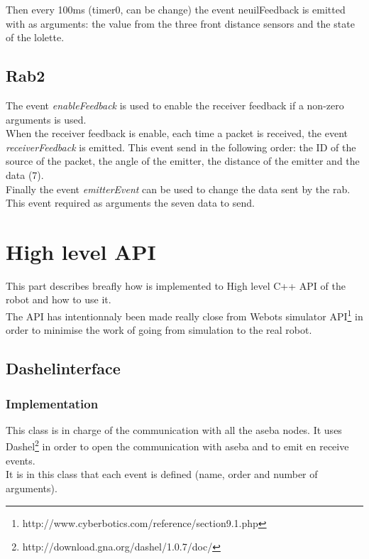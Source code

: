 \documentclass[a4paper,11pt]{report}
\begin{document}
Then every 100ms (timer0, can be change) the event neuilFeedback is emitted with as arguments: the value from the three front distance sensors and the state of the lolette.\\

\section{Rab2}
The event \textit{enableFeedback} is used to enable the receiver feedback if a non-zero arguments is used.\\

When the receiver feedback is enable, each time a packet is received, the event \textit{receiverFeedback} is emitted. This event send in the following order: the ID of the source of the packet, the angle of the emitter, the distance of the emitter and the data (7).\\

Finally the event \textit{emitterEvent} can be used to change the data sent by the rab. This event required as arguments the seven data to send.\\



\newpage
\chapter{High level API}
This part describes breafly how is implemented to High level C++ API of the robot and how to use it.\\

The API has intentionnaly been made really close from Webots simulator API\footnote{http://www.cyberbotics.com/reference/section9.1.php} in order to minimise the work of going from simulation to the real robot.\\

\section{Dashelinterface}
\subsection{Implementation}
This class is in charge of the communication with all the aseba nodes. It uses Dashel\footnote{http://download.gna.org/dashel/1.0.7/doc/} in order to open the communication with aseba and to emit en receive events.\\

It is in this class that each event is defined (name, order and number of arguments).
\end{document}
